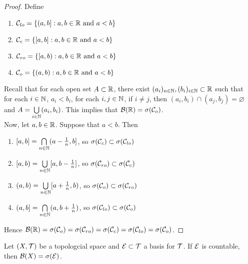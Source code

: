 \documentclass{book}
\begin{document}
	\begin{proof}
		Define 
		\begin{enumerate}
			\item $\mathcal{C}_{lo} = \{(a,b]:a,b \in \mathbb{R} \text{ and } a<b\}$\\
			\item $\mathcal{C}_{c} = \{[a,b]:a,b \in \mathbb{R} \text{ and } a<b\}$\\
			\item $\mathcal{C}_{ro} = \{[a,b):a,b \in \mathbb{R} \text{ and } a<b\}$\\
			\item $\mathcal{C}_{o} = \{(a,b):a,b \in \mathbb{R} \text{ and } a<b\}$\\
		\end{enumerate} 
		Recall that for each open set $A \subset \mathbb{R}$, there exist $(a_i)_{n \in \mathbb{N}}, (b_i)_{i \in \mathbb{N}} \subset \mathbb{R}$ such that for each $i \in \mathbb{N}$, $a_i < b_i$, for each $i,j \in \mathbb{N}$, if $i \neq j$, then $(a_i,b_i) \cap (a_j, b_j) = \varnothing$ and $A = \bigcup\limits_{i \in \mathbb{N}}(a_i, b_i)$. This implies that $\mathcal{B}(\mathbb{R}) = \sigma(\mathcal{C}_o)$. \vspace{2mm}\\
		Now, let $a,b \in \mathbb{R}$. Suppose that $a<b$. Then 
		\begin{enumerate}
			\item $[a,b] = \bigcap\limits_{n \in \mathbb{N}}(a- \frac{1}{n}, b]$, so $\sigma(\mathcal{C}_{c}) \subset \sigma(\mathcal{C}_{lo})$\\
			\item $[a,b) = \bigcup\limits_{n \in \mathbb{N}} [a,b-\frac{1}{n}]$, so $\sigma(\mathcal{C}_{ro}) \subset \sigma(\mathcal{C}_{c})$ \\
			\item $(a,b) = \bigcup\limits_{n \in \mathbb{N}} [a+\frac{1}{n},b)$, so $\sigma(\mathcal{C}_{o}) \subset \sigma(\mathcal{C}_{ro})$\\
			\item $(a,b] = \bigcap\limits_{n \in \mathbb{N}} (a,b+\frac{1}{n})$, so $\sigma(\mathcal{C}_{lo}) \subset \sigma(\mathcal{C}_{o})$\\
		\end{enumerate}
		Hence $\mathcal{B}(\mathbb{R}) = \sigma(\mathcal{C}_o) = \sigma(\mathcal{C}_{ro}) = \sigma(\mathcal{C}_{c}) = \sigma(\mathcal{C}_{lo}) = \sigma(\mathcal{C}_{o})$. 
	\end{proof}

	\begin{ex}
		Let $(X, \mathcal{T})$ be a topologcial space and $\mathcal{E} \subset \mathcal{T}$ a basis for $\mathcal{T}$. If $\mathcal{E}$ is countable, then $\mathcal{B}(X) = \sigma(\mathcal{E})$.  
	\end{ex}
\end{document}
